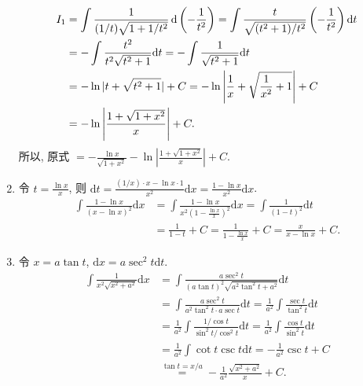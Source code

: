 \begin{solution}
\begin{enumerate}
\begin{align*}
                  I_1 & = \int \frac{1}{(1/t) \sqrt{1 + 1/t^2}} \operatorname{d}\left(-\frac{1}{t^2}\right) = \int \frac{t}{\sqrt{(t^2+1)/t^2}} \left(-\frac{1}{t^2}\right) \mathrm{d}t \\
                      & = -\int \frac{t^2}{t^2 \sqrt{t^2+1}} \mathrm{d}t = -\int \frac{1}{\sqrt{t^2+1}} \mathrm{d}t                                                          \\
                      & = -\ln|t + \sqrt{t^2+1}| + C = -\ln\left|\frac{1}{x} + \sqrt{\frac{1}{x^2} + 1}\right| + C                                                           \\
                      & = -\ln\left|\frac{1 + \sqrt{1 + x^2}}{x}\right| + C.
              \end{align*}
              所以, 原式 $= -\frac{\ln x}{\sqrt{1+x^2}} - \ln\left|\frac{1 + \sqrt{1 + x^2}}{x}\right| + C$.

        \item %
              令 $t = \frac{\ln x}{x}$, 则 $\mathrm{d}t = \frac{(1/x) \cdot x - \ln x \cdot 1}{x^2} \mathrm{d}x = \frac{1 - \ln x}{x^2} \mathrm{d}x$.
              \begin{align*}
                  \int \frac{1 - \ln x}{(x - \ln x)^2} \mathrm{d}x & = \int \frac{1 - \ln x}{x^2 (1 - \frac{\ln x}{x})^2} \mathrm{d}x = \int \frac{1}{(1 - t)^2} \mathrm{d}t \\
                                                                   & = \frac{1}{1 - t} + C = \frac{1}{1 - \frac{\ln x}{x}} + C = \frac{x}{x - \ln x} + C.
              \end{align*}

        \item %
              令 $x = a \tan t$, $\mathrm{d}x = a \sec^2 t \mathrm{d}t$.
              \begin{align*}
                  \int \frac{1}{x^2 \sqrt{x^2 + a^2}} \mathrm{d}x & = \int \frac{a \sec^2 t}{(a \tan t)^2 \sqrt{a^2 \tan^2 t + a^2}} \mathrm{d}t                                                 \\
                                                                  & = \int \frac{a \sec^2 t}{a^2 \tan^2 t \cdot a \sec t} \mathrm{d}t = \frac{1}{a^2} \int \frac{\sec t}{\tan^2 t} \mathrm{d}t   \\
                                                                  & = \frac{1}{a^2} \int \frac{1/\cos t}{\sin^2 t/\cos^2 t} \mathrm{d}t = \frac{1}{a^2} \int \frac{\cos t}{\sin^2 t} \mathrm{d}t \\
                                                                  & = \frac{1}{a^2} \int \cot t \csc t \mathrm{d}t = -\frac{1}{a^2} \csc t + C                                                   \\
                                                                  & \overset{\tan t = x/a}{=} -\frac{1}{a^2} \frac{\sqrt{x^2 + a^2}}{x} + C.
              \end{align*}


\end{enumerate}
\end{solution}
